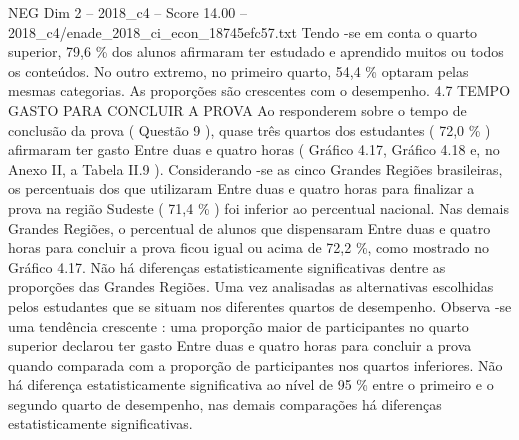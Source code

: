 \begin{textsample}{NEG Dim 2 – 2018\_c4 – Score 14.00 – 2018\_c4/enade\_2018\_ci\_econ\_18745efc57.txt}
Tendo -se em conta o quarto superior, 79,6 \% dos alunos afirmaram ter estudado e aprendido muitos ou todos os conteúdos.
No outro extremo, no primeiro quarto, 54,4 \% optaram pelas mesmas categorias.
As proporções são crescentes com o desempenho. 4.7 TEMPO GASTO PARA CONCLUIR A PROVA Ao responderem sobre o tempo de conclusão da prova ( Questão 9 ), quase três quartos dos estudantes ( 72,0 \% ) afirmaram ter gasto Entre duas e quatro horas ( Gráfico 4.17, Gráfico 4.18 e, no Anexo II, a Tabela II.9 ).
Considerando -se as cinco Grandes Regiões brasileiras, os percentuais dos que utilizaram Entre duas e quatro horas para finalizar a prova na região Sudeste ( 71,4 \% ) foi inferior ao percentual nacional.
Nas demais Grandes Regiões, o percentual de alunos que dispensaram Entre duas e quatro horas para concluir a prova ficou igual ou acima de 72,2 \%, como mostrado no Gráfico 4.17.
Não há diferenças estatisticamente significativas dentre as proporções das Grandes Regiões.
Uma vez analisadas as alternativas escolhidas pelos estudantes que se situam nos diferentes quartos de desempenho.
Observa -se uma tendência crescente : uma proporção maior de participantes no quarto superior declarou ter gasto Entre duas e quatro horas para concluir a prova quando comparada com a proporção de participantes nos quartos inferiores.
Não há diferença estatisticamente significativa ao nível de 95 \% entre o primeiro e o segundo quarto de desempenho, nas demais comparações há diferenças estatisticamente significativas.

\end{textsample}
